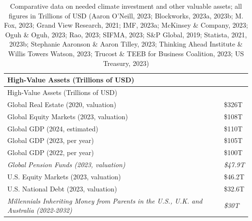 \documentclass[
  12pt,
  letterpaper,
  DIV=11,
  numbers=noendperiod]{scrartcl}
\begin{document}
\def\pandoctableshortcapt{Comparing Required Climate Investment and
Valuable Assets}

\begin{longtable}[]{@{}
  >{\raggedright\arraybackslash}p{}
  >{\raggedright\arraybackslash}p{}@{}}
\caption[Comparing Required Climate Investment and Valuable
Assets]{Comparative data on needed climate investment and other valuable
assets; all figures in Trillions of USD (Aaron O'Neill, 2023;
Blockworks, 2023a, 2023b; M. Fox, 2023; Grand View Research, 2021; IMF,
2023a; McKinsey \& Company, 2023; Oguh \& Oguh, 2023; Rao, 2023; SIFMA,
2023; S\&P Global, 2019; Statista, 2021, 2023b; Stephanie Aaronson \&
Aaron Tilley, 2023; Thinking Ahead Institute \& Willis Towers Watson,
2023; Trucost \& TEEB for Business Coalition, 2023; US Treasury,
2023)}\tabularnewline
\toprule\noalign{}
\begin{minipage}[b]{\linewidth}\raggedright
High-Value Assets (Trillions of USD)
\end{minipage} & \begin{minipage}[b]{\linewidth}\raggedright
\end{minipage} \\
\midrule\noalign{}
\endfirsthead
\toprule\noalign{}
\begin{minipage}[b]{\linewidth}\raggedright
High-Value Assets (Trillions of USD)
\end{minipage} & \begin{minipage}[b]{\linewidth}\raggedright
\end{minipage} \\
\midrule\noalign{}
\endhead
\bottomrule\noalign{}
\endlastfoot
Global Real Estate (2020, valuation) & \$326T \\
Global Equity Markets (2023, valuation) & \$108T \\
Global GDP (2024, estimated) & \$110T \\
Global GDP (2023, per year) & \$105T \\
Global GDP (2022, per year) & \$100T \\
\emph{Global Pension Funds (2023, valuation)} & \emph{\$47.9T} \\
U.S. Equity Markets (2023, valuation) & \$46.2T \\
U.S. National Debt (2023, valuation) & \$32.6T \\
\emph{Millennials Inheriting Money from Parents in the U.S., U.K. and
Australia (2022-2032)} & \emph{\$30T} \\

\end{longtable}
\end{document}
